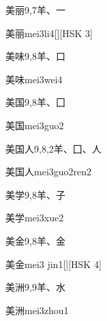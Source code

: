 \begin{entry}{美丽}{9,7}{⽺、⼀}
  \begin{phonetics}{美丽}{mei3li4}[][HSK 3]
  \end{phonetics}
\end{entry}

\begin{entry}{美味}{9,8}{⽺、⼝}
  \begin{phonetics}{美味}{mei3wei4}
  \end{phonetics}
\end{entry}

\begin{entry}{美国}{9,8}{⽺、⼞}
  \begin{phonetics}{美国}{mei3guo2}
  \end{phonetics}
\end{entry}

\begin{entry}{美国人}{9,8,2}{⽺、⼞、⼈}
  \begin{phonetics}{美国人}{mei3guo2ren2}
  \end{phonetics}
\end{entry}

\begin{entry}{美学}{9,8}{⽺、⼦}
  \begin{phonetics}{美学}{mei3xue2}
  \end{phonetics}
\end{entry}

\begin{entry}{美金}{9,8}{⽺、⾦}
  \begin{phonetics}{美金}{mei3 jin1}[][HSK 4]
  \end{phonetics}
\end{entry}

\begin{entry}{美洲}{9,9}{⽺、⽔}
  \begin{phonetics}{美洲}{mei3zhou1}
  \end{phonetics}
\end{entry}

